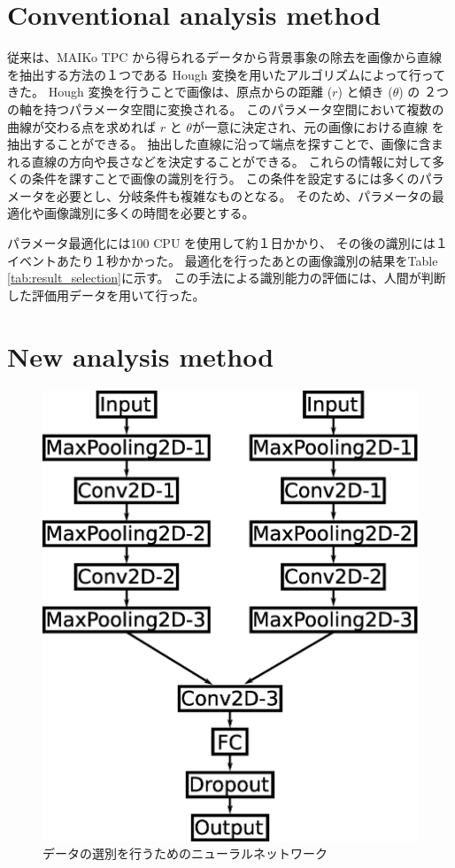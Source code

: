 \documentclass{jps-cp}
\begin{document}
\section{Conventional analysis method}
従来は、MAIKo TPC から得られるデータから背景事象の除去を画像から直線を抽出する方法の１つである
Hough 変換を用いたアルゴリズムによって行ってきた。
Hough 変換を行うことで画像は、原点からの距離 ($r$) と傾き ($\theta$) の
２つの軸を持つパラメータ空間に変換される。
このパラメータ空間において複数の曲線が交わる点を求めれば
$r$ と $\theta$が一意に決定され、元の画像における直線
を抽出することができる。
抽出した直線に沿って端点を探すことで、画像に含まれる直線の方向や長さなどを決定することができる。
これらの情報に対して多くの条件を課すことで画像の識別を行う。
この条件を設定するには多くのパラメータを必要とし、分岐条件も複雑なものとなる。
そのため、パラメータの最適化や画像識別に多くの時間を必要とする。

パラメータ最適化には100 CPU を使用して約１日かかり、
その後の識別には１イベントあたり１秒かかった。
最適化を行ったあとの画像識別の結果をTable \ref{tab:result_selection}に示す。
この手法による識別能力の評価には、人間が判断した評価用データを用いて行った。

\section{New analysis method}

\begin{figure}
  \centering
  \includegraphics[clip, width=15zw]{eps/event_selection.eps}
  \caption{データの選別を行うためのニューラルネットワーク}
  \label{fig:selection}
\end{figure}
\end{document}
